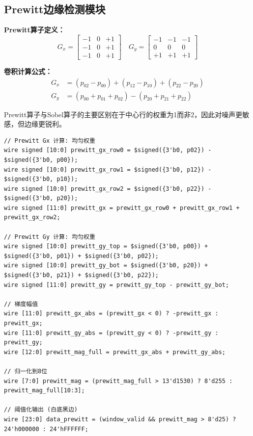 \documentclass[12pt,hyperref,a4paper,UTF8]{ctexart}
\begin{document}
\subsection{Prewitt边缘检测模块}

\textbf{Prewitt算子定义：}
\begin{equation}
G_x = \begin{bmatrix} -1 & 0 & +1 \\ -1 & 0 & +1 \\ -1 & 0 & +1 \end{bmatrix} \quad
G_y = \begin{bmatrix} -1 & -1 & -1 \\ 0 & 0 & 0 \\ +1 & +1 & +1 \end{bmatrix}
\end{equation}

\textbf{卷积计算公式：}
\begin{align}
G_x &= (p_{02} - p_{00}) + (p_{12} - p_{10}) + (p_{22} - p_{20}) \\
G_y &= (p_{00} + p_{01} + p_{02}) - (p_{20} + p_{21} + p_{22})
\end{align}

Prewitt算子与Sobel算子的主要区别在于中心行的权重为1而非2，因此对噪声更敏感，但边缘更锐利。

\begin{lstlisting}[caption={Prewitt边缘检测代码}]
// Prewitt Gx 计算: 均匀权重
wire signed [10:0] prewitt_gx_row0 = $signed({3'b0, p02}) - $signed({3'b0, p00});
wire signed [10:0] prewitt_gx_row1 = $signed({3'b0, p12}) - $signed({3'b0, p10});
wire signed [10:0] prewitt_gx_row2 = $signed({3'b0, p22}) - $signed({3'b0, p20});
wire signed [11:0] prewitt_gx = prewitt_gx_row0 + prewitt_gx_row1 + prewitt_gx_row2;

// Prewitt Gy 计算: 均匀权重
wire signed [10:0] prewitt_gy_top = $signed({3'b0, p00}) + $signed({3'b0, p01}) + $signed({3'b0, p02});
wire signed [10:0] prewitt_gy_bot = $signed({3'b0, p20}) + $signed({3'b0, p21}) + $signed({3'b0, p22});
wire signed [11:0] prewitt_gy = prewitt_gy_top - prewitt_gy_bot;

// 梯度幅值
wire [11:0] prewitt_gx_abs = (prewitt_gx < 0) ? -prewitt_gx : prewitt_gx;
wire [11:0] prewitt_gy_abs = (prewitt_gy < 0) ? -prewitt_gy : prewitt_gy;
wire [12:0] prewitt_mag_full = prewitt_gx_abs + prewitt_gy_abs;

// 归一化到8位
wire [7:0] prewitt_mag = (prewitt_mag_full > 13'd1530) ? 8'd255 : prewitt_mag_full[10:3];

// 阈值化输出 (白底黑边)
wire [23:0] data_prewitt = (window_valid && prewitt_mag > 8'd25) ? 24'h000000 : 24'hFFFFFF;
\end{lstlisting}
\end{document}
